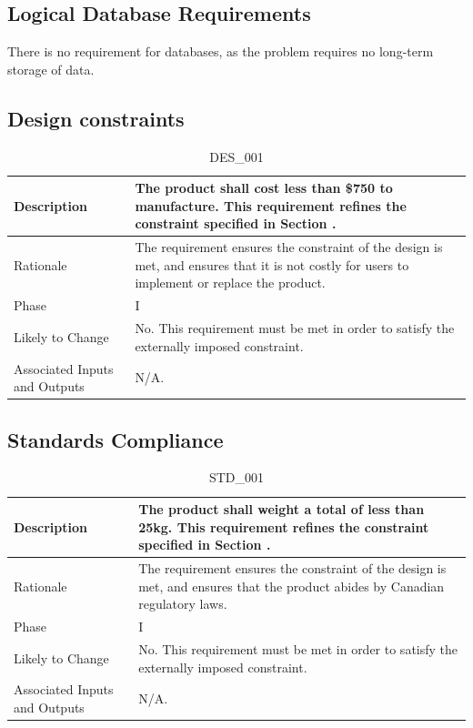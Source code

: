 \documentclass{article}
\begin{document}
\clearpage
\newpage

\subsection{Logical Database Requirements}
There is no requirement for databases, as the problem requires no long-term storage of data.

\subsection{Design constraints }
\begin{table}[!h]
\begin{center}
\caption {DES\_001} 
\label{DES_001}
\begin{tabular}{ | m{3cm} | m{11cm} | }
\hline
Description & The product shall cost less than \$750 to manufacture. This requirement refines the constraint specified in Section \nameref{sec:Constraints}. \\
\hline
Rationale & The requirement ensures the constraint of the design is met, and ensures that it is not costly for users to implement or replace the product. \\
\hline
Phase & I \\
\hline
Likely to Change &  No. This requirement must be met in order to satisfy the externally imposed constraint. \\
\hline
Associated Inputs and Outputs & N/A.  \\
\hline
\end{tabular}
\end{center}
\end{table}

\subsection{Standards Compliance }
\begin{table}[!h]
\begin{center}
\caption {STD\_001} 
\label{STD_001}
\begin{tabular}{ | m{3cm} | m{11cm} | }
\hline
Description & The product shall weight a total of less than 25kg. This requirement refines the constraint specified in Section \nameref{sec:Constraints}. \\
\hline
Rationale & The requirement ensures the constraint of the design is met, and ensures that the product abides by Canadian regulatory laws. \\
\hline
Phase & I \\
\hline
Likely to Change &  No. This requirement must be met in order to satisfy the externally imposed constraint. \\
\hline
Associated Inputs and Outputs & N/A.  \\
\hline
\end{tabular}
\end{center}
\end{table}
\end{document}
